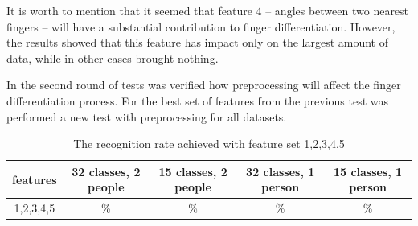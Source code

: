 It is worth to mention that it seemed that feature 4 -- angles between two nearest fingers -- will have a substantial contribution to finger differentiation. However, the results showed that this feature has impact only on the largest amount of data, while in other cases brought nothing.

In the second round of tests was verified how preprocessing will affect the finger differentiation process. For the best set of features from the previous test was performed a new test with preprocessing for all datasets. 

\begin{table}[htp!]
\begin{center}
	\label{findiffpre}
	\caption{The recognition rate achieved with feature set 1,2,3,4,5}
    \begin{tabular}{|c|c|c|c|c|}
    \hline
    features & 32 classes, 2 people & 15 classes, 2 people & 32 classes, 1 person  & 15 classes, 1 person  \\ \hline
    1,2,3,4,5           & \% & \%  & \% & \% \\ \hline
    \end{tabular}
    \end{center}
\end{table}



